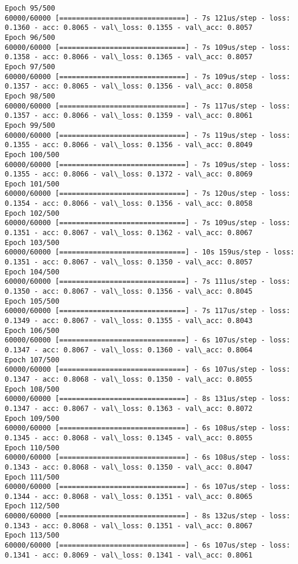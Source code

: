 \documentclass[11pt]{article}
\begin{document}
\begin{Verbatim}[commandchars=\\\{\}]
Epoch 95/500
60000/60000 [==============================] - 7s 121us/step - loss: 0.1360 - acc: 0.8065 - val\_loss: 0.1355 - val\_acc: 0.8057
Epoch 96/500
60000/60000 [==============================] - 7s 109us/step - loss: 0.1358 - acc: 0.8066 - val\_loss: 0.1365 - val\_acc: 0.8057
Epoch 97/500
60000/60000 [==============================] - 7s 109us/step - loss: 0.1357 - acc: 0.8065 - val\_loss: 0.1356 - val\_acc: 0.8058
Epoch 98/500
60000/60000 [==============================] - 7s 117us/step - loss: 0.1357 - acc: 0.8066 - val\_loss: 0.1359 - val\_acc: 0.8061
Epoch 99/500
60000/60000 [==============================] - 7s 119us/step - loss: 0.1355 - acc: 0.8066 - val\_loss: 0.1356 - val\_acc: 0.8049
Epoch 100/500
60000/60000 [==============================] - 7s 109us/step - loss: 0.1355 - acc: 0.8066 - val\_loss: 0.1372 - val\_acc: 0.8069
Epoch 101/500
60000/60000 [==============================] - 7s 120us/step - loss: 0.1354 - acc: 0.8066 - val\_loss: 0.1356 - val\_acc: 0.8058
Epoch 102/500
60000/60000 [==============================] - 7s 109us/step - loss: 0.1351 - acc: 0.8067 - val\_loss: 0.1362 - val\_acc: 0.8067
Epoch 103/500
60000/60000 [==============================] - 10s 159us/step - loss: 0.1351 - acc: 0.8067 - val\_loss: 0.1350 - val\_acc: 0.8057
Epoch 104/500
60000/60000 [==============================] - 7s 111us/step - loss: 0.1350 - acc: 0.8067 - val\_loss: 0.1356 - val\_acc: 0.8045
Epoch 105/500
60000/60000 [==============================] - 7s 117us/step - loss: 0.1349 - acc: 0.8067 - val\_loss: 0.1355 - val\_acc: 0.8043
Epoch 106/500
60000/60000 [==============================] - 6s 107us/step - loss: 0.1347 - acc: 0.8067 - val\_loss: 0.1360 - val\_acc: 0.8064
Epoch 107/500
60000/60000 [==============================] - 6s 107us/step - loss: 0.1347 - acc: 0.8068 - val\_loss: 0.1350 - val\_acc: 0.8055
Epoch 108/500
60000/60000 [==============================] - 8s 131us/step - loss: 0.1347 - acc: 0.8067 - val\_loss: 0.1363 - val\_acc: 0.8072
Epoch 109/500
60000/60000 [==============================] - 6s 108us/step - loss: 0.1345 - acc: 0.8068 - val\_loss: 0.1345 - val\_acc: 0.8055
Epoch 110/500
60000/60000 [==============================] - 6s 108us/step - loss: 0.1343 - acc: 0.8068 - val\_loss: 0.1350 - val\_acc: 0.8047
Epoch 111/500
60000/60000 [==============================] - 6s 107us/step - loss: 0.1344 - acc: 0.8068 - val\_loss: 0.1351 - val\_acc: 0.8065
Epoch 112/500
60000/60000 [==============================] - 8s 132us/step - loss: 0.1343 - acc: 0.8068 - val\_loss: 0.1351 - val\_acc: 0.8067
Epoch 113/500
60000/60000 [==============================] - 6s 107us/step - loss: 0.1341 - acc: 0.8069 - val\_loss: 0.1341 - val\_acc: 0.8061

\end{Verbatim}
\end{document}
